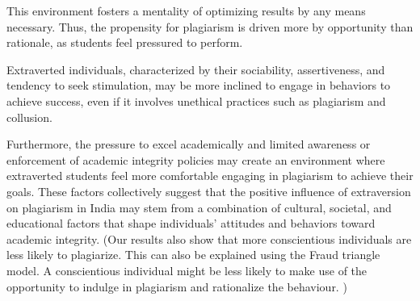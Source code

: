 This environment fosters a mentality of optimizing results by any means necessary. Thus, the propensity for plagiarism is driven more by opportunity than rationale, as students feel pressured to perform. 

Extraverted individuals, characterized by their sociability, assertiveness, and tendency to seek stimulation, may be more inclined to engage in behaviors to achieve success, even if it involves unethical practices such as plagiarism and collusion.

Furthermore, the pressure to excel academically and limited awareness or enforcement of academic integrity policies may create an environment where extraverted students feel more comfortable engaging in plagiarism to achieve their goals. These factors collectively suggest that the positive influence of extraversion on plagiarism in India may stem from a combination of cultural, societal, and educational factors that shape individuals' attitudes and behaviors toward academic integrity.
\color{blue}(Our results also show that more conscientious individuals are less likely to plagiarize. This can also be explained using the Fraud triangle model. A conscientious individual might be less likely to make use of the opportunity to indulge in plagiarism and rationalize the behaviour. )\color{black}